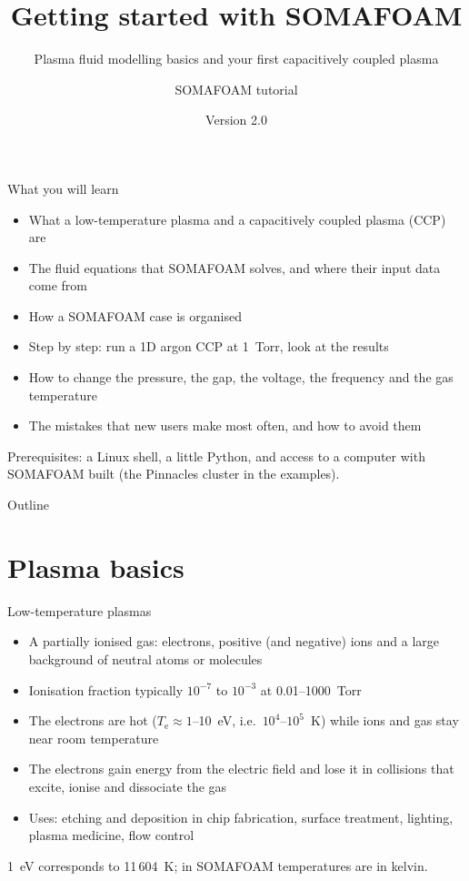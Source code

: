 \documentclass[aspectratio=169,11pt]{beamer}
\title{Getting started with SOMAFOAM}
\subtitle{Plasma fluid modelling basics and your first capacitively coupled plasma}
\author{SOMAFOAM tutorial}
\date{Version 2.0}
\newcommand{\Te}{T_\mathrm{e}}
\begin{document}
\begin{frame}
  \titlepage
\end{frame}

\begin{frame}{What you will learn}
  \begin{itemize}
    \item What a low-temperature plasma and a capacitively coupled plasma (CCP) are
    \item The fluid equations that SOMAFOAM solves, and where their input data come from
    \item How a SOMAFOAM case is organised
    \item Step by step: run a 1D argon CCP at 1~Torr, look at the results
    \item How to change the pressure, the gap, the voltage, the frequency and the gas temperature
    \item The mistakes that new users make most often, and how to avoid them
  \end{itemize}
  \vfill
  \small Prerequisites: a Linux shell, a little Python, and access to a computer
  with SOMAFOAM built (the Pinnacles cluster in the examples).
\end{frame}

\begin{frame}{Outline}
  \tableofcontents
\end{frame}

\section{Plasma basics}

\begin{frame}{Low-temperature plasmas}
  \begin{itemize}
    \item A partially ionised gas: electrons, positive (and negative) ions and a large
          background of neutral atoms or molecules
    \item Ionisation fraction typically $10^{-7}$ to $10^{-3}$ at 0.01--1000~Torr
    \item The electrons are hot ($\Te \approx 1$--10~eV, i.e.\ $10^4$--$10^5$~K) while ions
          and gas stay near room temperature
    \item The electrons gain energy from the electric field and lose it in collisions
          that excite, ionise and dissociate the gas
    \item Uses: etching and deposition in chip fabrication, surface treatment,
          lighting, plasma medicine, flow control
  \end{itemize}
  \vfill
  \small 1~eV corresponds to 11\,604~K; in SOMAFOAM temperatures are in kelvin.
\end{frame}
\end{document}

